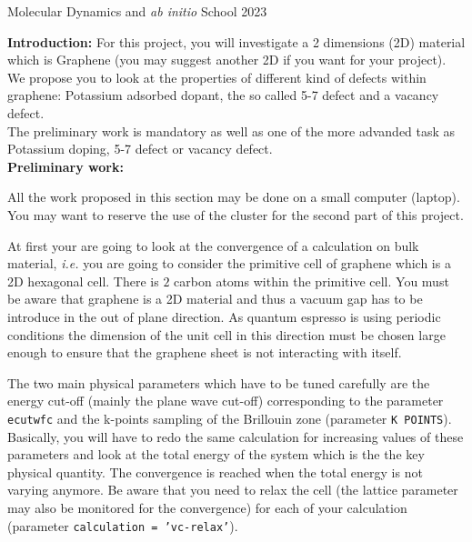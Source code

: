 \documentclass[11pt]{article}
\begin{document}
\thispagestyle{empty}


\parbox[t]{1.\linewidth}{\centerline{\color{blue}\Large Molecular
    Dynamics and {\it ab initio} School 2023}}
\parbox[t]{1.\linewidth}{\hrulefill}


\vspace{10pt}

\centerline{\Huge{\color{red}{2D graphene}}}

\vspace{10pt}

{\bf{Introduction:}} For this project, you will investigate a 2
dimensions (2D) material which is Graphene (you may suggest another 2D
if you want for your project). We propose you to look at the
properties of different kind of defects within graphene: Potassium
adsorbed dopant, the so called 5-7 defect and a vacancy defect.\\


The preliminary work is mandatory as well as one of the more advanded
task as Potassium doping, 5-7 defect or vacancy defect.\\


{\bf{Preliminary work:}}

All the work proposed in this section may be done on a small computer
(laptop). You may want to reserve the use of the cluster for the
second part of this project.

At first your are going to look at the convergence of a calculation on
bulk material, {\it{i.e.}} you are going to consider the primitive cell
of graphene which is a 2D hexagonal cell. There is $2$ carbon atoms
within the primitive cell. You must be aware that graphene is a 2D
material and thus a vacuum gap has to be introduce in the out of plane
direction. As quantum espresso is using periodic conditions the
dimension of the unit cell in this direction must be chosen large
enough to ensure that the graphene sheet is not interacting with
itself.


The two main physical parameters which have to be tuned carefully are
the energy cut-off (mainly the plane wave cut-off) corresponding to
the parameter {\texttt{ecutwfc}} and the k-points sampling of the
Brillouin zone (parameter {\texttt{K\textunderscore
    POINTS}}). Basically, you will have to redo the same calculation
for increasing values of these parameters and look at the total energy
of the system which is the the key physical quantity. The convergence
is reached when the total energy is not varying anymore. Be aware that
you need to relax the cell (the lattice parameter may also be
monitored for the convergence) for each of your calculation (parameter
{\texttt{calculation = 'vc-relax'}}).\\
\end{document}
